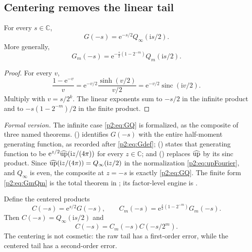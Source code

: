\documentclass[11pt,oneside]{article}
\numberwithin{equation}{section}
\theoremstyle{definition}
\theoremstyle{remark}
\newcommand{\C}{\mathbb C}
\newcommand{\e}{\mathrm e}
\newcommand{\ii}{\mathrm i}
\newcommand{\sinc}{\operatorname{sinc}}
\begin{document}
\subsection{Centering removes the linear tail}

\begin{lemma}
\label{p2:lem:GQ}
For every $s\in\C$,
\begin{equation}
 \boxed{G(-s)=\e^{-s/2}Q_\infty(\ii s/2).}
 \label{p2:eq:GQ}
\end{equation}
More generally,
\begin{equation}
 G_m(-s)=\e^{-\frac{s}{2}(1-2^{-m})}Q_m(\ii s/2).
 \label{p2:eq:GmQm}
\end{equation}
\end{lemma}

\begin{proof}
For every $v$,
\[
 \frac{1-\e^{-v}}{v}=\e^{-v/2}\frac{\sinh(v/2)}{v/2}
 =\e^{-v/2}\sinc(\ii v/2).
\]
Multiply with $v=s/2^k$.  The linear exponents sum to $-s/2$ in the infinite product and to
$-s(1-2^{-m})/2$ in the finite product.
\end{proof}

\emph{Formal version.}  The infinite case \eqref{p2:eq:GQ} is formalized, as the composite of
three named theorems.  
() identifies $G(-s)$ with the entire half-moment
generating function, as recorded after \eqref{p2:eq:Gdef};
 ()
states that generating function to be $\e^{z/2}\widehat\Up(\ii z/(4\pi))$ for every
$z\in\C$; and  () replaces
$\widehat{\operatorname{up}}$ by its sinc product.  Since $\widehat\Up(\ii z/(4\pi))=Q_\infty(\ii z/2)$ in the
normalization \eqref{p2:eq:upFourier}, and $Q_\infty$ is even, the composite at $z=-s$ is exactly
\eqref{p2:eq:GQ}.  The finite form \eqref{p2:eq:GmQm} is the total theorem
in ; its factor-level engine is
.

Define the centered products
\begin{equation}
 C(-s)=\e^{s/2}G(-s),\qquad
 C_m(-s)=\e^{\frac{s}{2}(1-2^{-m})}G_m(-s).
 \label{p2:eq:centered-G}
\end{equation}
Then $C(-s)=Q_\infty(\ii s/2)$ and
\begin{equation}
 C(-s)=C_m(-s)C(-s/2^m).
 \label{p2:eq:centered-tail}
\end{equation}
The centering is not cosmetic: the raw tail has a first-order error, while the centered tail
has a second-order error.
\end{document}
